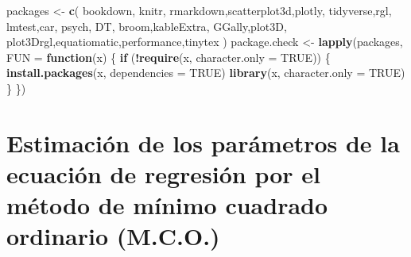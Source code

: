 \documentclass[
]{book}
\newenvironment{Shaded}{\begin{snugshade}}{\end{snugshade}}
\newcommand{\AttributeTok}[1]{\textcolor[rgb]{0.13,0.29,0.53}{#1}}
\newcommand{\ConstantTok}[1]{\textcolor[rgb]{0.56,0.35,0.01}{#1}}
\newcommand{\ControlFlowTok}[1]{\textcolor[rgb]{0.13,0.29,0.53}{\textbf{#1}}}
\newcommand{\FunctionTok}[1]{\textcolor[rgb]{0.13,0.29,0.53}{\textbf{#1}}}
\newcommand{\NormalTok}[1]{#1}
\newcommand{\OtherTok}[1]{\textcolor[rgb]{0.56,0.35,0.01}{#1}}
\newcommand{\SpecialCharTok}[1]{\textcolor[rgb]{0.81,0.36,0.00}{\textbf{#1}}}
\newcommand{\StringTok}[1]{\textcolor[rgb]{0.31,0.60,0.02}{#1}}
\begin{document}
\begin{Shaded}
\begin{Highlighting}[]
\NormalTok{packages }\OtherTok{\textless{}{-}} \FunctionTok{c}\NormalTok{(}
 \StringTok{\textquotesingle{}bookdown\textquotesingle{}}\NormalTok{, }\StringTok{\textquotesingle{}knitr\textquotesingle{}}\NormalTok{, }\StringTok{\textquotesingle{}rmarkdown\textquotesingle{}}\NormalTok{,}\StringTok{\textquotesingle{}scatterplot3d\textquotesingle{}}\NormalTok{,}\StringTok{\textquotesingle{}plotly\textquotesingle{}}\NormalTok{, }\StringTok{\textquotesingle{}tidyverse\textquotesingle{}}\NormalTok{,}\StringTok{\textquotesingle{}rgl\textquotesingle{}}\NormalTok{, }\StringTok{\textquotesingle{}lmtest\textquotesingle{}}\NormalTok{,}\StringTok{\textquotesingle{}car\textquotesingle{}}\NormalTok{, }\StringTok{\textquotesingle{}psych\textquotesingle{}}\NormalTok{, }\StringTok{\textquotesingle{}DT\textquotesingle{}}\NormalTok{, }\StringTok{\textquotesingle{}broom\textquotesingle{}}\NormalTok{,}\StringTok{\textquotesingle{}kableExtra\textquotesingle{}}\NormalTok{, }\StringTok{\textquotesingle{}GGally\textquotesingle{}}\NormalTok{,}\StringTok{\textquotesingle{}plot3D\textquotesingle{}}\NormalTok{, }\StringTok{\textquotesingle{}plot3Drgl\textquotesingle{}}\NormalTok{,}\StringTok{\textquotesingle{}equatiomatic\textquotesingle{}}\NormalTok{,}\StringTok{\textquotesingle{}performance\textquotesingle{}}\NormalTok{,}\StringTok{\textquotesingle{}tinytex\textquotesingle{}} 
\NormalTok{)}
\NormalTok{package.check }\OtherTok{\textless{}{-}} \FunctionTok{lapply}\NormalTok{(packages, }\AttributeTok{FUN =} \ControlFlowTok{function}\NormalTok{(x) \{}
  \ControlFlowTok{if}\NormalTok{ (}\SpecialCharTok{!}\FunctionTok{require}\NormalTok{(x, }\AttributeTok{character.only =} \ConstantTok{TRUE}\NormalTok{)) \{}
    \FunctionTok{install.packages}\NormalTok{(x, }\AttributeTok{dependencies =} \ConstantTok{TRUE}\NormalTok{)}
    \FunctionTok{library}\NormalTok{(x, }\AttributeTok{character.only =} \ConstantTok{TRUE}\NormalTok{)}
\NormalTok{  \}}
\NormalTok{\})}
\end{Highlighting}
\end{Shaded}

\hypertarget{Estimacion-M.C.O.}{%
\section{Estimación de los parámetros de la ecuación de regresión por el método de mínimo cuadrado ordinario (M.C.O.)}\label{Estimacion-M.C.O.}}
\end{document}
